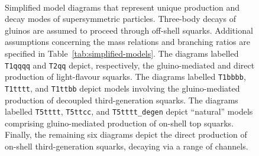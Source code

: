 \begin{figure}[tb]
\begin{center}
{      \label{fig:T2tt_degen_feyn}
    } ~~
     ~~
    \caption{ Simplified model diagrams that represent unique
      production and decay modes of supersymmetric
      particles. Three-body decays of gluinos are assumed to proceed
      through off-shell squarks. Additional assumptions concerning the
      mass relations and branching ratios are specified in
      Table~\ref{tab:simplified-models}. The diagrams labelled
      \texttt{T1qqqq} and \texttt{T2qq} depict, respectively, the
      gluino-mediated and direct production of light-flavour
      squarks. The diagrams labelled \texttt{T1bbbb}, \texttt{T1tttt},
      and \texttt{T1ttbb} depict models involving the gluino-mediated
      production of decoupled third-generation squarks. The diagrams
      labelled \texttt{T5tttt}, \texttt{T5ttcc}, and
      \texttt{T5tttt\_degen} depict ``natural'' models comprising
      gluino-mediated production of on-shell top squarks. Finally, the
      remaining six diagrams depict the direct production of on-shell
      third-generation squarks, decaying via a range of channels.  }
    \label{fig:simplified-models}
  \end{center}
\end{figure}

